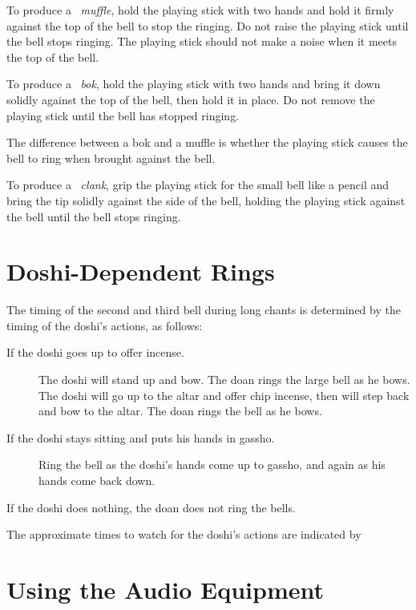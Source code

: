 \documentclass{kdo}
\begin{document}
To produce a \muffle\ \emph{muffle}, hold the playing stick with two hands and
hold it firmly against the top of the bell to stop the ringing. Do not raise
the playing stick until the bell stops ringing. The playing stick should not
make a noise when it meets the top of the bell.

To produce a \bok\ \emph{bok}, hold the playing stick with two hands and bring
it down solidly against the top of the bell, then hold it in place. Do not
remove the playing stick until the bell has stopped ringing.

The difference between a bok and a muffle is whether the playing stick causes
the bell to ring when brought against the bell.

To produce a \clank\ \emph{clank}, grip the playing stick for the small bell
like a pencil and bring the tip solidly against the side of the bell, holding
the playing stick against the bell until the bell stops ringing.

\section*{Doshi-Dependent Rings}
The timing of the second and third bell during long chants is determined by the
timing of the doshi's actions, as follows:

\begin{description}
\item[If the doshi goes up to offer incense.] The doshi will stand up and bow.
  The doan rings the large bell as he bows. The doshi will go up to the altar
  and offer chip incense, then will step back and bow to the altar. The doan
  rings the bell as he bows.
\item[If the doshi stays sitting and puts his hands in gassho.] Ring the bell
  as the doshi's hands come up to gassho, and again as his hands come back
  down.
\end{description}

If the doshi does nothing, the doan does not ring the bells.

The approximate times to watch for the doshi's actions are indicated by

\section*{Using the Audio Equipment}
\end{document}
